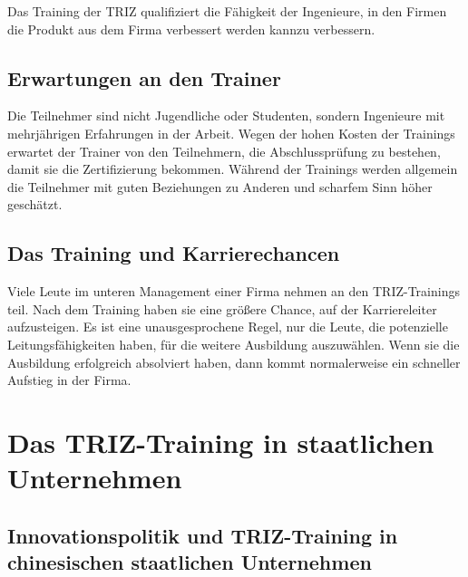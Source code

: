 \documentclass[11pt,a4paper]{article}
\begin{document}
Das Training der TRIZ qualifiziert die Fähigkeit der Ingenieure, in den Firmen
die Produkt aus dem Firma verbessert werden kannzu verbessern.
  
\subsection{Erwartungen an den Trainer}

Die Teilnehmer sind nicht Jugendliche oder Studenten, sondern Ingenieure mit
mehrjährigen Erfahrungen in der Arbeit. Wegen der hohen Kosten der Trainings
erwartet der Trainer von den Teilnehmern, die Abschlussprüfung zu bestehen,
damit sie die Zertifizierung bekommen.  Während der Trainings werden allgemein
die Teilnehmer mit guten Beziehungen zu Anderen und scharfem Sinn höher
geschätzt.

\subsection{Das Training und Karrierechancen}

Viele Leute im unteren Management einer Firma nehmen an den TRIZ-Trainings
teil.  Nach dem Training haben sie eine größere Chance, auf der Karriereleiter
aufzusteigen. Es ist eine unausgesprochene Regel, nur die Leute, die
potenzielle Leitungsfähigkeiten haben, für die weitere Ausbildung auszuwählen.
Wenn sie die Ausbildung erfolgreich absolviert haben, dann kommt normalerweise
ein schneller Aufstieg in der Firma.

\section{Das TRIZ-Training in staatlichen Unternehmen}

\subsection{Innovationspolitik und TRIZ-Training in chinesischen staatlichen
  Unternehmen}  
\end{document}
